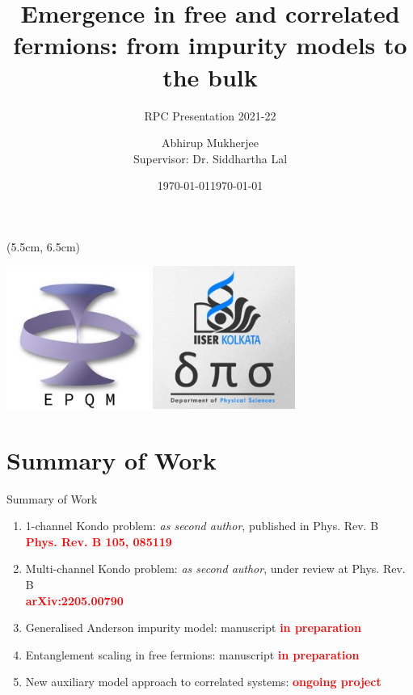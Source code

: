\documentclass[11pt,aspectratio=169]{beamer}
\title{Emergence in free and correlated fermions: from impurity models to the bulk}
\subtitle{RPC Presentation 2021-22}
\date{\today}
\author{Abhirup Mukherjee\\Supervisor: Dr. Siddhartha Lal}
\institute{Department of Physical Sciences, IISER Kolkata, Mohanpur}
\date{\today}
\newcommand{\focus}[1]{\textcolor{red}{\bf{#1}}}
\begin{document}
\centering

\begin{frame}
\maketitle
\begin{textblock*}{0.4\textwidth}(5.5cm, 6.5cm)
	\centering
	\vspace*{\fill}

	\includegraphics[width=0.35\textwidth]{figures/epqm_logo_mod.jpeg}
	\hspace*{\fill}
	\includegraphics[width=0.35\textwidth]{figures/dps_logo.jpeg}

	\vspace*{\fill}
\end{textblock*}
\end{frame}

\section{Summary of Work}

\begin{frame}{Summary of Work}
\begin{enumerate}
\item 1-channel Kondo problem: {\it as second author}, {published} in Phys. Rev. B\\
	\focus{Phys. Rev. B 105, 085119}\\[20pt]
	\item Multi-channel Kondo problem: {\it as second author}, {under review} at Phys. Rev. B\\
		\focus{arXiv:2205.00790}\\[20pt]
	\item Generalised Anderson impurity model: manuscript \focus{in preparation}\\[20pt]
	\item Entanglement scaling in free fermions: manuscript \focus{in preparation}\\[20pt]
	\item New auxiliary model approach to correlated systems: \focus{ongoing project}
\end{enumerate}

\end{frame}
\end{document}
